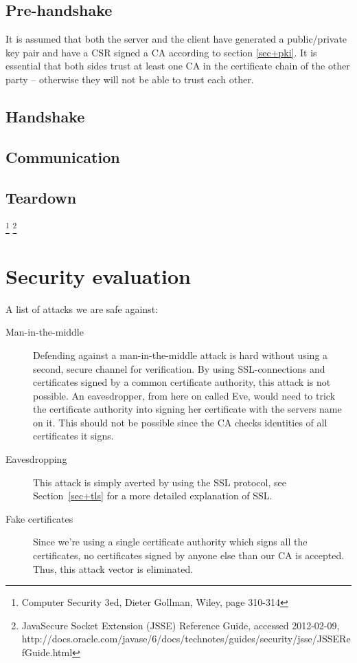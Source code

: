 \documentclass[10pt, a4paper]{article}
\begin{document}
\subsection{Pre-handshake}
It is assumed that both the server and the client have generated a public/private key pair and have a CSR signed a CA according to section \ref{sec+pki}. It is essential that both sides trust at least one CA in the certificate chain of the other party -- otherwise they will not be able to trust each other.

\subsection{Handshake}
\subsection{Communication}
\subsection{Teardown}


\footnote{Computer Security 3ed, Dieter Gollman, Wiley, page 310-314}
\footnote{Java\textregistered Secure Socket Extension (JSSE) Reference Guide, accessed 2012-02-09, http://docs.oracle.com/javase/6/docs/technotes/guides/security/jsse/JSSERefGuide.html}


\section{Security evaluation}
A list of attacks we are safe against:
\begin{description}
\item[Man-in-the-middle] Defending against a man-in-the-middle attack is hard without using a second, secure channel for verification. By using SSL-connections and certificates signed by a common certificate authority, this attack is not possible. An eavesdropper, from here on called Eve, would need to trick the certificate authority into signing her certificate with the servers name on it. This should not be possible since the CA checks identities of all certificates it signs.
\item[Eavesdropping] This attack is simply averted by using the SSL protocol, see Section~\ref{sec+tls} for a more detailed explanation of SSL.
\item[Fake certificates] Since we're using a single certificate authority which signs all the certificates, no certificates signed by anyone else than our CA is accepted. Thus, this attack vector is eliminated.
\end{description}
\end{document}

